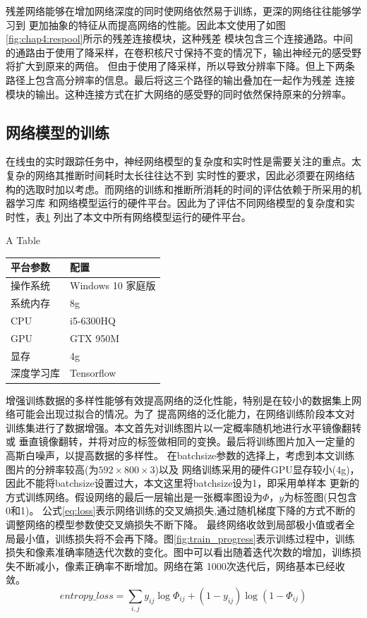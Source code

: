 	残差网络\cite{he2016deep}能够在增加网络深度的同时使网络依然易于训练，更深的网络往往能够学习到
	更加抽象的特征从而提高网络的性能。因此本文使用了如图\ref{fig:chap4:respool}所示的残差连接模块\cite{chu2017multi}，这种残差
	模块包含三个连接通路。中间的通路由于使用了降采样，在卷积核尺寸保持不变的情况下，输出神经元的感受野将扩大到原来的两倍。
	但由于使用了降采样，所以导致分辨率下降。但上下两条路径上包含高分辨率的信息。最后将这三个路径的输出叠加在一起作为残差
	连接模块的输出。这种连接方式在扩大网络的感受野的同时依然保持原来的分辨率。
	
\subsection{网络模型的训练}
	在线虫的实时跟踪任务中，神经网络模型的复杂度和实时性是需要关注的重点。太复杂的网络其推断时间耗时太长往往达不到
	实时性的要求，因此必须要在网络结构的选取时加以考虑。而网络的训练和推断所消耗的时间的评估依赖于所采用的机器学习库
	和网络模型运行的硬件平台。因此为了评估不同网络模型的复杂度和实时性，表\ref{tab:hardwareconfig}
	列出了本文中所有网络模型运行的硬件平台。
	\begin{table}[!hpb]
	\centering
    {A Table}
	\label{tab:hardwareconfig}
	\begin{tabular}{p{80pt}p{100pt}}
	\toprule
	平台参数 & 配置 \\
	\midrule
	操作系统 & Windows 10 家庭版\\
	系统内存 & 8g \\
	CPU & i5-6300HQ \\
	GPU & GTX 950M \\
	显存 & 4g \\
	深度学习库 & Tensorflow \\
	\bottomrule
	\end{tabular}
	\end{table}
	
	增强训练数据的多样性能够有效提高网络的泛化性能，特别是在较小的数据集上网络可能会出现过拟合的情况。为了
	提高网络的泛化能力，在网络训练阶段本文对训练集进行了数据增强。本文首先对训练图片以一定概率随机地进行水平镜像翻转或
	垂直镜像翻转，并将对应的标签做相同的变换。最后将训练图片加入一定量的高斯白噪声，以提高数据的多样性。
	在batchsize参数的选择上，考虑到本文训练图片的分辨率较高(为$592\times800\times3$)以及
	网络训练采用的硬件GPU显存较小(4g)，因此不能将batchsize设置过大，本文这里将batchsize设为1，即采用单样本
	更新的方式训练网络。假设网络的最后一层输出是一张概率图设为$\Phi$，$y$为标签图(只包含0和1)。
	公式\ref{eq:loss}表示网络训练的交叉熵损失,通过随机梯度下降的方式不断的调整网络的模型参数使交叉熵损失不断下降。
	最终网络收敛到局部极小值或者全局最小值，训练损失将不会再下降。图\ref{fig:train_progress}表示训练过程中，训练
	损失和像素准确率随迭代次数的变化。图中可以看出随着迭代次数的增加，训练损失不断减小，像素正确率不断增加。网络在第
	1000次迭代后，网络基本已经收敛。
		\begin{equation}
		entropy\_loss = \sum_{i,j}y_{ij}\log \Phi_{ij} + (1-y_{ij})\log (1-\Phi_{ij}) \label{eq:loss}
	\end{equation}
	

